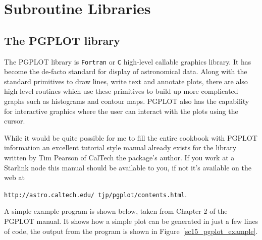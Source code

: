 \documentclass[twoside,11pt]{article}
\newcommand{\htmladdnormallink}[2]{#1}
\newcommand{\xlabel}[1]{}
\begin{document}
\section{\xlabel{sc15_libraries}Subroutine Libraries\label{sc15_libraries}}

\subsection{\xlabel{sc15_pgplot}The PGPLOT library\label{sc15_pgplot}}

The \htmladdnormallink{PGPLOT}{http://astro.caltech.edu/~tjp/pgplot/index.html} library is {\tt Fortran} or {\tt C} high-level callable graphics library. It has become the de-facto standard for display of astronomical data. Along with the standard primitives to draw lines, write text and annotate plots, there are also high level routines which use these primitives to build up more complicated graphs such as histograms and contour maps. PGPLOT also has the capability for interactive graphics where the user can interact with the plots using the cursor.

While it would be quite possible for me to fill the entire cookbook with PGPLOT information an excellent tutorial style manual already exists for the library written by \htmladdnormallink{Tim Pearson}{mailto:tjp@astro.caltech.edu} of CalTech the package's author. If you work at a Starlink node this manual should be available to you, if not it's available on the web at 
\begin{htmlonly}
\htmladdnormallink{{\tt http://astro.caltech.edu/~tjp/pgplot/contents.html}}{http://astro.caltech.edu/~tjp/pgplot/contents.html}.
\end{htmlonly}

A simple example program is shown below, taken from \htmladdnormallink{Chapter 2}{http://astro.caltech.edu/~tjp/pgplot/chapter2.html} of the PGPLOT manual. It shows how a simple plot can be generated in just a few lines of code, the output from the program is shown in Figure~\ref{sc15_pgplot_example}.
\end{document}
